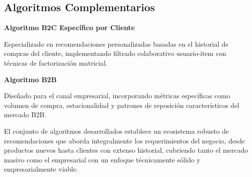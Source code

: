 \documentclass[twocolumn]{article}
\begin{document}
\subsection{Algoritmos Complementarios}

\textbf{Algoritmo B2C Específico por Cliente}

Especializado en recomendaciones personalizadas basadas en el historial de compras del cliente, implementando filtrado colaborativo usuario-item con técnicas de factorización matricial.

\textbf{Algoritmo B2B}

Diseñado para el canal empresarial, incorporando métricas específicas como volumen de compra, estacionalidad y patrones de reposición característicos del mercado B2B.

El conjunto de algoritmos desarrollados establece un ecosistema robusto de recomendaciones que aborda integralmente los requerimientos del negocio, desde productos nuevos hasta clientes con extenso historial, cubriendo tanto el mercado masivo como el empresarial con un enfoque técnicamente sólido y empresarialmente viable.
\end{document}
